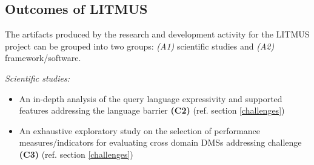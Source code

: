 \documentclass{llncs}
\begin{document}
    \subsection{Outcomes of LITMUS}
    The artifacts produced by the research and development activity for the LITMUS project can be grouped into two groups: \textit{(A1)} scientific studies and \textit{(A2)} framework/software. 
    
    \textit{Scientific studies:} 
        \begin{itemize}[nosep]
            \item An in-depth analysis of the query language expressivity and supported features addressing the language barrier \textbf{(C2)} (ref. section \ref{challenges})
            \item An exhaustive exploratory study on the selection of performance measures/indicators for evaluating cross domain DMSs addressing challenge \textbf{(C3)} (ref. section \ref{challenges})
        \end{itemize}
        
\end{document}

